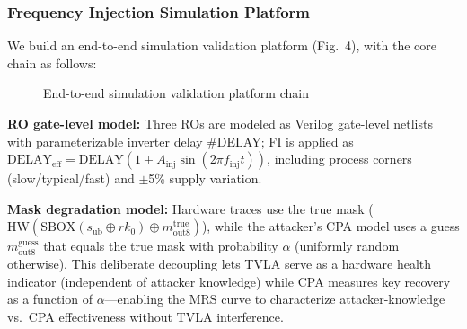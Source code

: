 \documentclass[journal]{IEEEtran}
\begin{document}
\subsubsection{Frequency Injection Simulation Platform}

We build an end-to-end simulation validation platform (Fig.~4), with the core chain as follows:

\begin{figure}[t]
\centering
{}
\caption{End-to-end simulation validation platform chain}
\label{fig:sim-platform}
\end{figure}

\textbf{RO gate-level model:} Three ROs are modeled as Verilog gate-level netlists with parameterizable inverter delay \#DELAY; FI is applied as $\text{DELAY}_{\text{eff}} = \text{DELAY}(1 + A_{\text{inj}}\sin(2\pi f_{\text{inj}} t))$, including process corners (slow/typical/fast) and $\pm$5\% supply variation.

\textbf{Mask degradation model:} Hardware traces use the true mask ($\text{HW}(\text{SBOX}(s_{\text{ub}} \oplus rk_0) \oplus m_{\text{out8}}^{\text{true}})$), while the attacker's CPA model uses a guess $m_{\text{out8}}^{\text{guess}}$ that equals the true mask with probability $\alpha$ (uniformly random otherwise). This deliberate decoupling lets TVLA serve as a hardware health indicator (independent of attacker knowledge) while CPA measures key recovery as a function of $\alpha$---enabling the MRS curve to characterize attacker-knowledge vs.\ CPA effectiveness without TVLA interference.
\end{document}
